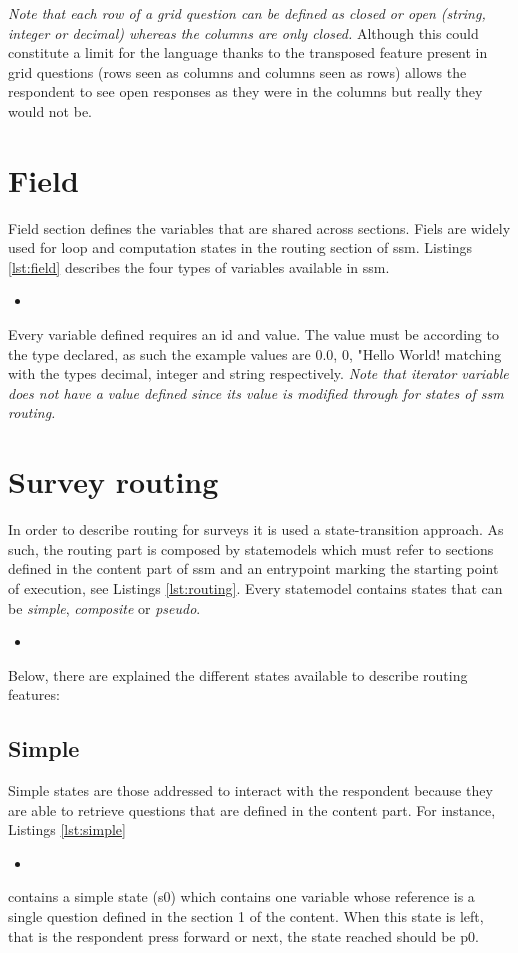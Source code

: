 \documentclass{article}
\newcommand{\insertcode}[3]{\begin{itemize}\item[]\end{itemize}} %
\begin{document}
\emph{Note that each row of a grid question can be defined as closed or open (string, integer or decimal) whereas the columns are only closed.} Although this could constitute a limit for the language thanks to the transposed feature present in grid questions (rows seen as columns and columns seen as rows) allows the respondent to see open responses as they were in the columns but really they would not be.
\section{Field}
Field section defines the variables that are shared across sections. Fiels are widely used for loop and computation states in the routing section of \gls{ssm}. Listings \ref{lst:field} describes the four types of variables available in \gls{ssm}.
\insertcode{"scripts/field.xml"}{Field examples}{lst:field}
Every variable defined requires an id and value. The value must be according to the type declared, as such the example values are 0.0, 0, "Hello World! matching with the types decimal, integer and string respectively. \emph{Note that iterator variable does not have a value defined since its value is modified through for states of \gls{ssm} routing.}
\section{Survey routing}
In order to describe routing for surveys it is used a state-transition approach. As such, the routing part is composed by statemodels which must refer to sections defined in the content part of \gls{ssm} and an entrypoint marking the starting point of execution, see Listings \ref{lst:routing}. Every statemodel contains states that can be \emph{simple}, \emph{composite} or \emph{pseudo}.
\insertcode{"scripts/routing.xml"}{Routing example}{lst:routing}
 Below, there are explained the different states available to describe routing features:
	\subsection{Simple}
	Simple states are those addressed to interact with the respondent because they are able to retrieve questions that are defined in the content part. For instance, Listings \ref{lst:simple}
\insertcode{"scripts/simple.xml"}{Simple state example}{lst:simple} 
contains a simple state (s0) which contains one variable whose reference is a single question defined in the section 1 of the content. When this state is left, that is the respondent press forward or next, the state reached should be p0.
\end{document}
